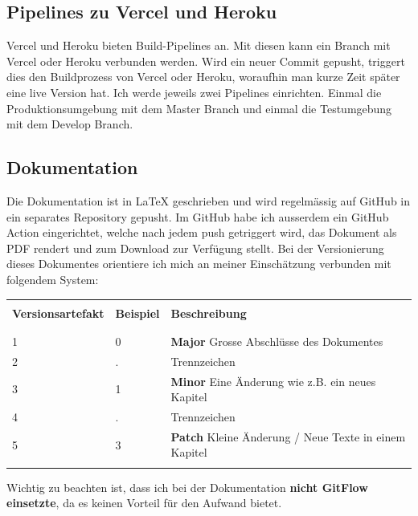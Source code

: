 \subsection{Pipelines zu Vercel und Heroku}
Vercel und Heroku bieten Build-Pipelines an. Mit diesen kann ein Branch mit Vercel oder Heroku verbunden werden. Wird ein neuer Commit gepusht, triggert dies den Buildprozess von Vercel oder Heroku, woraufhin man kurze Zeit später eine live Version hat.
\newline
\newline
Ich werde jeweils zwei Pipelines einrichten. Einmal die Produktionsumgebung mit dem Master Branch und einmal die Testumgebung mit dem Develop Branch.
\subsection{Dokumentation}
Die Dokumentation ist in LaTeX geschrieben und wird regelmässig auf GitHub in ein separates Repository gepusht. Im GitHub habe ich ausserdem ein GitHub Action eingerichtet, welche nach jedem push getriggert wird, das Dokument als PDF rendert und zum Download zur Verfügung stellt.
\newline
\newline
Bei der Versionierung dieses Dokumentes orientiere ich mich an meiner Einschätzung verbunden mit folgendem System:
\begin{table}[htp]
  \begin{tabularx}{\textwidth}{l l X}\hline \\
  \textbf{Versionsartefakt} & \textbf{Beispiel} & \textbf{Beschreibung} \\ \\\hline \\
  1 & 0 & \textbf{Major} Grosse Abschlüsse des Dokumentes \\
  2 & . & Trennzeichen \\
  3 & 1 & \textbf{Minor} Eine Änderung wie z.B. ein neues Kapitel \\
  4 & . & Trennzeichen \\
  5 & 3 & \textbf{Patch} Kleine Änderung / Neue Texte in einem Kapitel \\
  \\\hline
  \end{tabularx}
\end{table}
\newline
Wichtig zu beachten ist, dass ich bei der Dokumentation \textbf{nicht GitFlow einsetzte}, da es keinen Vorteil für den Aufwand bietet.
